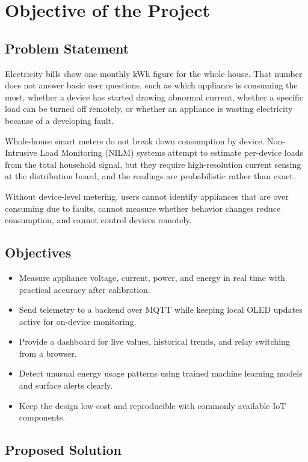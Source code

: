 \documentclass[12pt, a4paper]{article}
\numberwithin{figure}{section}
\numberwithin{table}{section}
\begin{document}
	\section{Objective of the Project}\label{sec:objective}
	
	\subsection{Problem Statement}
	
	Electricity bills show one monthly kWh figure for the whole house. That number does not answer basic user questions, such as which appliance is consuming the most, whether a device has started drawing abnormal current, whether a specific load can be turned off remotely, or whether an appliance is wasting electricity because of a developing fault.
	
	Whole-house smart meters do not break down consumption by device. Non-Intrusive Load Monitoring (NILM) systems attempt to estimate per-device loads from the total household signal, but they require high-resolution current sensing at the distribution board, and the readings are probabilistic rather than exact.
	
	Without device-level metering, users cannot identify appliances that are over consuming due to faults, cannot measure whether behavior changes reduce consumption, and cannot control devices remotely.
	
	\subsection{Objectives}
	
	\begin{itemize}
		\item Measure appliance voltage, current, power, and energy in real time with practical accuracy after calibration.
		\item Send telemetry to a backend over MQTT while keeping local OLED updates active for on-device monitoring.
		\item Provide a dashboard for live values, historical trends, and relay switching from a browser.
		\item Detect unusual energy usage patterns using trained machine learning models and surface alerts clearly.
		\item Keep the design low-cost and reproducible with commonly available IoT components.
	\end{itemize}
	
	\subsection{Proposed Solution}
	
\end{document}
